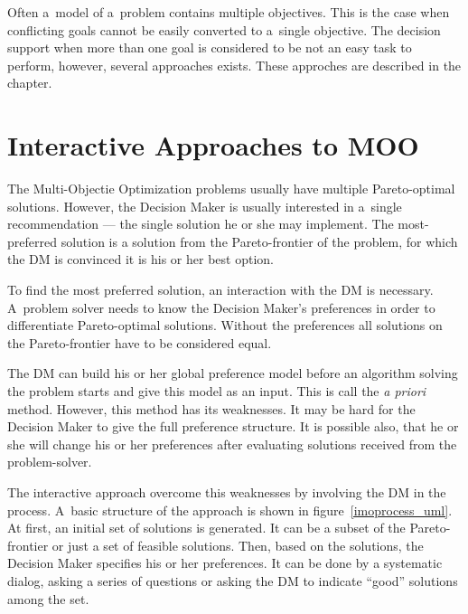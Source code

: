 Often a~model of a~problem contains multiple objectives. This is the case when
conflicting goals cannot be easily converted to a~single objective. The
decision support when more than one goal is considered to be not an easy task
to perform, however, several approaches exists. These approches are described
in the chapter.

\section{Interactive Approaches to MOO}
\label{sec_ia_in_moo}

The Multi-Objectie Optimization problems usually have multiple Pareto-optimal
solutions. However, the Decision Maker is usually interested in a~single
recommendation --- the single solution he or she may implement. The
most-preferred solution is a solution from the Pareto-frontier of the problem,
for which the DM is convinced it is his or her best option.

To find the most preferred solution, an interaction with the DM is
necessary. A~problem solver needs to know the Decision Maker's preferences in
order to differentiate Pareto-optimal solutions. Without the preferences all
solutions on the Pareto-frontier have to be considered equal.

The DM can build his or her global preference model before an algorithm
solving the problem starts and give this model as an input. This is call the
\textit{a priori} method. However, this method has its weaknesses. It may be
hard for the Decision Maker to give the full preference structure. It is
possible also, that he or she will change his or her preferences after
evaluating solutions received from the problem-solver. 

The interactive approach overcome this weaknesses by involving the DM in the
process. A~basic structure of the approach is shown in
figure~\ref{imoprocess_uml}. At first, an initial set of solutions is
generated. It can be a subset of the Pareto-frontier or just a set of feasible
solutions. Then, based on the solutions, the Decision Maker specifies his or
her preferences. It can be done by a systematic dialog, asking a series of
questions or asking the DM to indicate ``good'' solutions among the set.

